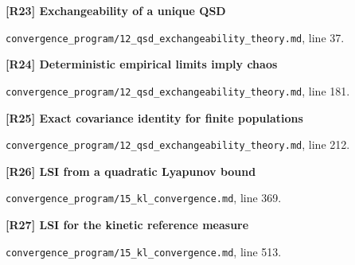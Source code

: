 \documentclass[11pt,a4paper]{article}
\begin{document}
\par\medskip\noindent\begin{minipage}{\linewidth}\textbf{[R23] Exchangeability of a unique QSD}\label{src:thm-qsd-exchangeability}\par
{\small\texttt{}\par
\nolinkurl{convergence_program/12_qsd_exchangeability_theory.md}, line 37.\par}
\end{minipage}\par

\par\medskip\noindent\begin{minipage}{\linewidth}\textbf{[R24] Deterministic empirical limits imply chaos}\label{src:thm-propagation-chaos-qsd}\par
{\small\texttt{}\par
\nolinkurl{convergence_program/12_qsd_exchangeability_theory.md}, line 181.\par}
\end{minipage}\par

\par\medskip\noindent\begin{minipage}{\linewidth}\textbf{[R25] Exact covariance identity for finite populations}\label{src:thm-correlation-decay}\par
{\small\texttt{}\par
\nolinkurl{convergence_program/12_qsd_exchangeability_theory.md}, line 212.\par}
\end{minipage}\par

\par\medskip\noindent\begin{minipage}{\linewidth}\textbf{[R26] LSI from a quadratic Lyapunov bound}\label{src:thm-unconditional-lsi}\par
{\small\texttt{}\par
\nolinkurl{convergence_program/15_kl_convergence.md}, line 369.\par}
\end{minipage}\par

\par\medskip\noindent\begin{minipage}{\linewidth}\textbf{[R27] LSI for the kinetic reference measure}\label{src:thm-kinetic-lsi}\par
{\small\texttt{}\par
\nolinkurl{convergence_program/15_kl_convergence.md}, line 513.\par}
\end{minipage}\par
\end{document}

